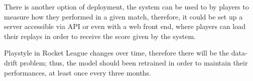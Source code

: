 There is another option of deployment, the system can be used to by players to measure how they performed in a given match, therefore, it could be set up a server accessible via API or even with a web front end, where players can load their replays in order to receive the score given by the system.

Playstyle in Rocket League changes over time, therefore there will be the data-drift problem; thus, the model should been retrained in order to maintain their performances, at least once every three months. 
